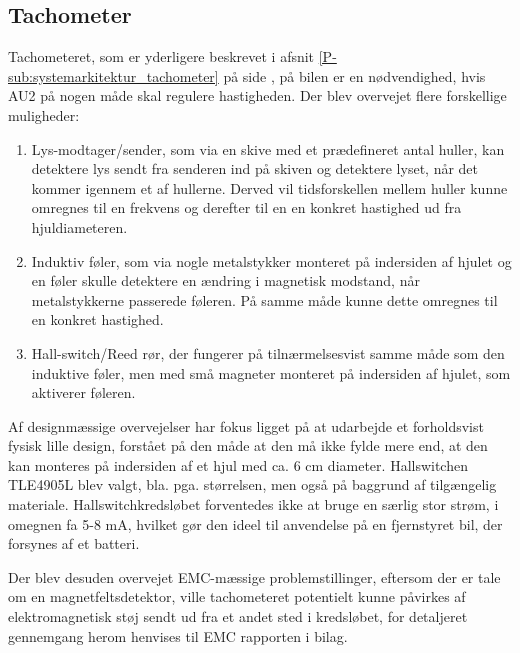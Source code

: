 \subsection{Tachometer}

Tachometeret, som er yderligere beskrevet i afsnit \ref{P-sub:systemarkitektur_tachometer}  på side \pageref{P-sub:systemarkitektur_tachometer}, på bilen er en nødvendighed, hvis AU2 på nogen måde skal regulere hastigheden. Der blev overvejet flere forskellige muligheder:
\begin{enumerate}
	\item Lys-modtager/sender, som via en skive med et prædefineret antal huller, kan detektere lys sendt fra senderen ind på skiven og detektere lyset, når det kommer igennem et af hullerne. Derved vil tidsforskellen mellem huller kunne omregnes til en frekvens og derefter til en en konkret hastighed ud fra hjuldiameteren.
	\item Induktiv føler, som via nogle metalstykker monteret på indersiden af hjulet og en føler skulle detektere en ændring i magnetisk modstand, når metalstykkerne passerede føleren. På samme måde kunne dette omregnes til en konkret hastighed.
	\item Hall-switch/Reed rør, der fungerer på tilnærmelsesvist samme måde som den induktive føler, men med små magneter monteret på indersiden af hjulet, som aktiverer føleren.
\end{enumerate}

Af designmæssige overvejelser har fokus ligget på at udarbejde et forholdsvist fysisk lille design, forstået på den måde at den må ikke fylde mere end, at den kan monteres på indersiden af et hjul med ca. 6 cm diameter.
Hallswitchen TLE4905L \cite{lib:tacho} blev valgt, bla. pga. størrelsen, men også på baggrund af tilgængelig materiale. Hallswitchkredsløbet forventedes ikke at bruge en særlig stor strøm, i omegnen fa 5-8 mA, hvilket gør den ideel til anvendelse på en fjernstyret bil, der forsynes af et batteri. 

Der blev desuden overvejet EMC-mæssige problemstillinger, eftersom der er tale om en magnetfeltsdetektor, ville tachometeret potentielt kunne påvirkes af elektromagnetisk støj sendt ud fra et andet sted i kredsløbet, for detaljeret gennemgang herom henvises til EMC rapporten i bilag\cite{lib:emcrap}.
